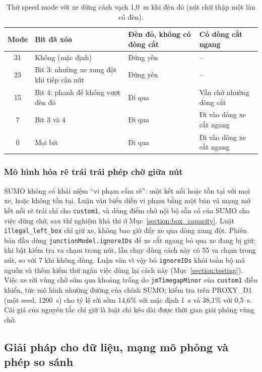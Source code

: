 \documentclass[../main.tex]{subfiles}
\begin{document}
\begin{table}[!htbp]
\centering
\small
\caption{Thử speed mode với xe dừng cách vạch 1,0~m khi đèn đỏ (nút chữ thập một làn có đèn).} \label{table:5.1}
\begin{tabular}{|c|>{\raggedright\arraybackslash}p{5.8cm}|>{\raggedright\arraybackslash}p{2.6cm}|>{\raggedright\arraybackslash}p{3.4cm}|}
\hline
\textbf{Mode} & \textbf{Bit đã xóa} & \textbf{Đèn đỏ, không có dòng cắt} & \textbf{Có dòng cắt ngang} \\ \hline
31 & Không (mặc định) & Đứng yên & -- \\ \hline
23 & Bit 3: nhường xe xung đột khi tiếp cận nút & Đứng yên & -- \\ \hline
15 & Bit 4: phanh để không vượt đèn đỏ & Đi qua & Vẫn chờ nhường dòng cắt \\ \hline
7 & Bit 3 và 4 & Đi qua & Đi vào dòng xe cắt ngang \\ \hline
0 & Mọi bit & Đi qua & Đi vào dòng xe cắt ngang \\ \hline
\end{tabular}
\end{table}

\subsubsection{Mô hình hóa rẽ trái trái phép chờ giữa nút}
\label{section:5.3}

SUMO không có khái niệm ``vi phạm cấm rẽ'': một kết nối hoặc tồn tại với mọi xe, hoặc không tồn tại. Luận văn biểu diễn vi phạm bằng một bản vá mạng mở kết nối rẽ trái chỉ cho \texttt{custom1}, và dùng điểm chờ nội bộ sẵn có của SUMO cho việc dừng chờ, sau thí nghiệm khả thi ở Mục~\ref{section:box_capacity}. Luật \texttt{illegal\_left\_box} chỉ giữ xe, không bao giờ đẩy xe qua dòng xung đột. Phiên bản đầu dùng \texttt{junctionModel.ignoreIDs} để xe cắt ngang bỏ qua xe đang bị giữ; khi bật kiểm tra va chạm trong nút, lần chạy dùng cách này có 55 va chạm trong nút, so với 7 khi không dùng. Luận văn vì vậy bỏ \texttt{ignoreIDs} khỏi toàn bộ mã nguồn và thêm kiểm thử ngăn việc dùng lại cách này (Mục~\ref{section:testing}). Việc xe rời vùng chờ sớm qua khoảng trống do \texttt{jmTimegapMinor} của \texttt{custom1} điều khiển, tức mô hình nhường đường của chính SUMO; kiểm tra trên PROXY\_D1 (một seed, 1200~s) cho tỷ lệ rời sớm 14,6\% với mặc định 1~s và 38,1\% với 0,5~s. Cái giá của nguyên tắc chỉ giữ là luật chỉ kéo dài được thời gian giải phóng vùng chờ.

\subsection{Giải pháp cho dữ liệu, mạng mô phỏng và phép so sánh}
\label{subsection:solutions_data}
\end{document}
